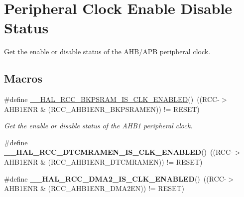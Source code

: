 \hypertarget{group___r_c_c_ex___peripheral___clock___enable___disable___status}{}\section{Peripheral Clock Enable Disable Status}
\label{group___r_c_c_ex___peripheral___clock___enable___disable___status}


Get the enable or disable status of the A\+H\+B/\+A\+PB peripheral clock.  


\subsection*{Macros}
\begin{DoxyCompactItemize}
\item 
\#define \mbox{\hyperlink{group___r_c_c_ex___peripheral___clock___enable___disable___status_ga71189681029c9b592e24f61de213ff29}{\+\_\+\+\_\+\+H\+A\+L\+\_\+\+R\+C\+C\+\_\+\+B\+K\+P\+S\+R\+A\+M\+\_\+\+I\+S\+\_\+\+C\+L\+K\+\_\+\+E\+N\+A\+B\+L\+ED}}()~((R\+CC-\/$>$A\+H\+B1\+E\+NR \& (R\+C\+C\+\_\+\+A\+H\+B1\+E\+N\+R\+\_\+\+B\+K\+P\+S\+R\+A\+M\+EN)) != R\+E\+S\+ET)
\begin{DoxyCompactList}\small\item\em Get the enable or disable status of the A\+H\+B1 peripheral clock. \end{DoxyCompactList}\item 
\mbox{\label{group___r_c_c_ex___peripheral___clock___enable___disable___status_gacb9b2ee99a11b3e0c4ef39bcf1d07600}} 
\#define {\bfseries \+\_\+\+\_\+\+H\+A\+L\+\_\+\+R\+C\+C\+\_\+\+D\+T\+C\+M\+R\+A\+M\+E\+N\+\_\+\+I\+S\+\_\+\+C\+L\+K\+\_\+\+E\+N\+A\+B\+L\+ED}()~((R\+CC-\/$>$A\+H\+B1\+E\+NR \& (R\+C\+C\+\_\+\+A\+H\+B1\+E\+N\+R\+\_\+\+D\+T\+C\+M\+R\+A\+M\+EN)) != R\+E\+S\+ET)
\item 
\mbox{\label{group___r_c_c_ex___peripheral___clock___enable___disable___status_gad0ccdaf669ea327e80c455db4dc36177}} 
\#define {\bfseries \+\_\+\+\_\+\+H\+A\+L\+\_\+\+R\+C\+C\+\_\+\+D\+M\+A2\+\_\+\+I\+S\+\_\+\+C\+L\+K\+\_\+\+E\+N\+A\+B\+L\+ED}()~((R\+CC-\/$>$A\+H\+B1\+E\+NR \& (R\+C\+C\+\_\+\+A\+H\+B1\+E\+N\+R\+\_\+\+D\+M\+A2\+EN)) != R\+E\+S\+ET)
\item 

\end{DoxyCompactItemize}
